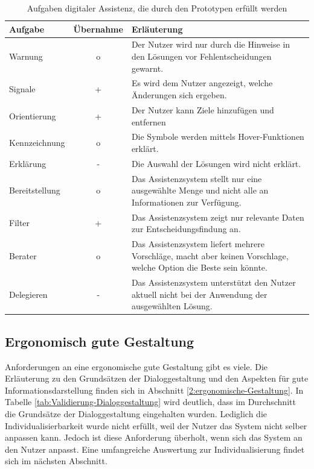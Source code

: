 \begin{table}[htb]
\caption{Aufgaben digitaler Assistenz, die durch den Prototypen erfüllt werden}
\centering
\begin{tabular}{l|c|p{}}
\textbf{Aufgabe} & \textbf{Übernahme} & \textbf{Erläuterung} \\
\hline
Warnung & o & Der Nutzer wird nur durch die Hinweise in den Lösungen vor Fehlentscheidungen gewarnt.\\
\hline
Signale & + & Es wird dem Nutzer angezeigt, welche Änderungen sich ergeben.\\
\hline
Orientierung & + & Der Nutzer kann Ziele hinzufügen und entfernen \\
\hline
Kennzeichnung & o & Die Symbole werden mittels Hover-Funktionen erklärt.\\
\hline
Erklärung & - & Die Auswahl der Lösungen wird nicht erklärt.\\
\hline
Bereitstellung & o & Das Assistenzsystem stellt nur eine ausgewählte Menge und nicht alle an Informationen zur Verfügung.\\
\hline
Filter & + & Das Assistenzsystem zeigt nur relevante Daten zur Entscheidungsfindung an.\\
\hline
Berater & o & Das Assistenzsystem liefert mehrere Vorschläge, macht aber keinen Vorschlage, welche Option die Beste sein könnte. \\
\hline
Delegieren & - & Das Assistenzsystem unterstützt den Nutzer aktuell nicht bei der Anwendung der ausgewählten Lösung.\\
\end{tabular}
\label{tab:Aufgaben-Assistenz-Prototyp}
\end{table}

\subsection*{Ergonomisch gute Gestaltung}
Anforderungen an eine ergonomische gute Gestaltung gibt es viele. Die Erläuterung zu den Grundsätzen der Dialoggestaltung und den Aspekten für gute Informationsdarstellung finden sich in Abschnitt \ref{2:ergonomische-Gestaltung}. In Tabelle \ref{tab:Validierung-Dialoggestaltung} wird deutlich, dass im Durchschnitt die Grundsätze der Dialoggestaltung eingehalten wurden. Lediglich die Individualisierbarkeit wurde nicht erfüllt, weil der Nutzer das System nicht selber anpassen kann. Jedoch ist diese Anforderung überholt, wenn sich das System an den Nutzer anpasst. Eine umfangreiche Auswertung zur Individualisierung findet sich im nächsten Abschnitt.


